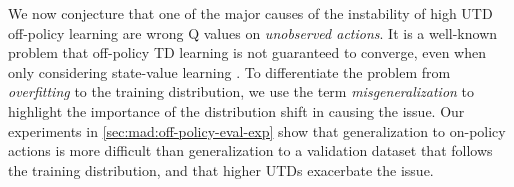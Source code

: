 We now conjecture that one of the major causes of the instability of high UTD off-policy learning are wrong Q values on \emph{unobserved actions}.
It is a well-known problem that off-policy TD learning is not guaranteed to converge, even when only considering state-value learning \parencite{baird1995residual,tsitsiklis1996analysis,sutton2016emphatic,ghosh2020representations}.
To differentiate the problem from \emph{overfitting} to the training distribution, we use the term \emph{misgeneralization} to highlight the importance of the distribution shift in causing the issue.
Our experiments in \autoref{sec:mad:off-policy-eval-exp} show that generalization to on-policy actions is more difficult than generalization to a validation dataset that follows the training distribution, and that higher UTDs exacerbate the issue.

